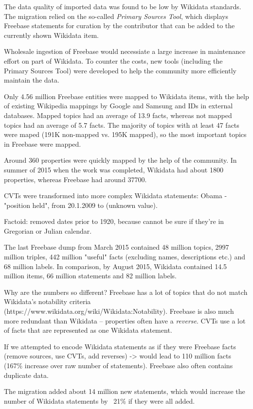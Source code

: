 The data quality of imported data was found to be low by Wikidata standards.
The migration relied on the so-called \textit{Primary Sources Tool}, which
displays Freebase statements for curation by the contributor that can be added
to the currently shown Wikidata item.

Wholesale ingestion of Freebase would necessiate a large increase in
maintenance effort on part of Wikidata. To counter the costs, new tools
(including the Primary Sources Tool) were developed to help the community
more efficiently maintain the data.

Only 4.56 million Freebase entities were mapped to Wikidata items, with the help
of existing Wikipedia mappings by Google and Samsung and IDs in external
databases.
Mapped topics had an average of 13.9 facts, whereas not mapped topics had an
average of 5.7 facts. The majority of topics with at least 47 facts were maped
(191K non-mapped vs. 195K mapped), so the most important topics in Freebase were
mapped.

Around 360 properties were quickly mapped by the help of the community. In
summer of 2015 when the work was completed, Wikidata had about 1800 properties,
whereas Freebase had around 37700.

CVTs were transformed into more complex Wikidata statements:
Obama - "position held", from 20.1.2009 to (unknown value).

Factoid: removed dates prior to 1920, because cannot be sure if they're in
Gregorian or Julian calendar.

The last Freebase dump from March 2015 contained 48 million topics, 2997 million
triples, 442 million "useful" facts (excluding names, descriptions etc.) and 68
million labels.
In comparison, by August 2015, Wikidata contained 14.5 million items, 66 million
statements and 82 million labels.

Why are the numbers so different? Freebase has a lot of topics that do not match
Wikidata's notability criteria (https://www.wikidata.org/wiki/Wikidata:Notability).
Freebase is also much more redundant than Wikidata -- properties often have a
\textit{reverse}.
CVTs use a lot of facts that are represented as one Wikidata statement.

If we attempted to encode Wikidata statements as if they were Freebase facts
(remove sources, use CVTs, add reverses) -> would lead to 110 million facts
(167\% increase over raw number of statements).
Freebase also often contains duplicate data.

The migration added about 14 million new statements, which would increase the
number of Wikidata statements by ~21\% if they were all added.

